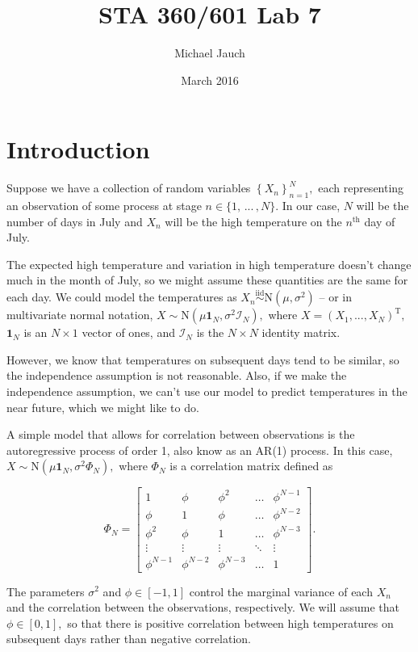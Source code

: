\documentclass{article}
\title{STA 360/601 Lab 7}
\author{Michael Jauch}
\date{March 2016}
\begin{document}
\maketitle

\section*{Introduction}

Suppose we have a collection of random variables $\left\{X_n\right\}_{n=1}^{N},$ each representing an observation of some process at stage $n\in\{1, \, ...\,, N\}.$ In our case, $N$ will be the number of days in July and $X_n$ will be the high temperature on the $n^\text{th}$ day of July.

The expected high temperature and variation in high temperature doesn't change much in the month of July, so we might assume these quantities are the same for each day.
We could model the temperatures as $X_n \stackrel{\text{iid}}{\sim} \text{N}(\mu, \sigma^2)$ -- or in multivariate normal notation, $X  \sim \text{N}(\mu\mathbf{1}_N, \sigma^2\mathcal{I}_N),$ where $X = (X_1, ..., X_N)^{\text{T}},$ $\mathbf{1}_N$ is an $N\times1$ vector of ones, and $\mathcal{I}_N$ is the $N \times N$ identity matrix. 

However, we know that temperatures on subsequent days tend to be similar, so the independence assumption is not reasonable. Also, if we make the independence assumption, we can't use our model to predict temperatures in the near future, which we might like to do. 

A simple model that allows for correlation between observations is the autoregressive process of order 1, also know as an AR(1) process. In this case, $X  \sim \text{N}(\mu\mathbf{1}_N, \sigma^2\Phi_N),$ where $\Phi_N$ is a correlation matrix defined as 

\[
\Phi_N = 
\begin{bmatrix}
    1 & \phi & \phi^2 & \dots  & \phi^{N-1} \\
    \phi & 1 & \phi & \dots  & \phi^{N-2} \\ 
     \phi^2 & \phi & 1 & \dots  & \phi^{N-3} \\ 
    \vdots & \vdots & \vdots & \ddots & \vdots \\
    \phi^{N-1} & \phi^{N-2} & \phi^{N-3} & \dots  & 1
\end{bmatrix}.
\]

The parameters $\sigma^2$ and $\phi\in[-1,1]$ control the marginal variance of each $X_n$ and the correlation between the observations, respectively. We will assume that $\phi \in [0,1],$ so that there is positive correlation between high temperatures on subsequent days rather than negative correlation. 
\end{document}
